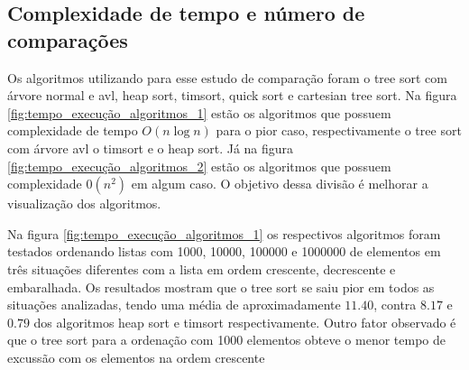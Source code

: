 \documentclass[12pt]{article}
\begin{document}
\begin{table}[H]
    \centering
    \caption{Complexidade de implementação dos algoritmos}
    \label{tab:algo_complexity_table}
\end{table}

\subsection{Complexidade de tempo e número de comparações}

Os algoritmos utilizando para esse estudo de comparação foram o tree sort com árvore normal e avl, heap sort, timsort, quick sort e cartesian tree sort. Na figura \ref{fig:tempo_execução_algoritmos_1} estão os algoritmos que possuem complexidade de tempo $O(n\log{}n)$ para o pior caso, respectivamente o tree sort com árvore avl o timsort e o heap  sort. Já na figura \ref{fig:tempo_execução_algoritmos_2} estão os algoritmos que possuem complexidade $0(n^2)$ em algum caso. O objetivo dessa divisão é melhorar a visualização dos algoritmos.

Na figura \ref{fig:tempo_execução_algoritmos_1} os respectivos algoritmos foram testados ordenando listas com 1000, 10000, 100000 e 1000000 de elementos em três situações diferentes com a lista em ordem crescente, decrescente e embaralhada. Os resultados mostram que o tree sort se saiu pior em todos as situações analizadas, tendo uma média de aproximadamente $11.40$, contra $8.17$ e $0.79$ dos algoritmos heap sort e timsort respectivamente. Outro fator observado é que o tree sort para a ordenação com 1000 elementos obteve o menor tempo de excussão com os elementos na ordem crescente   
\end{document}
